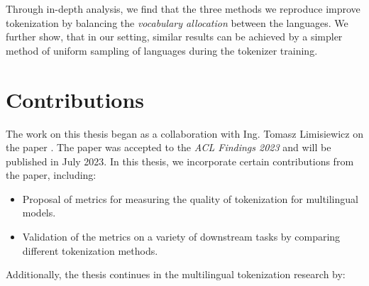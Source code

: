 
Through in-depth analysis, we find that the three methods we reproduce \cite{chung_improving_2020,zheng_allocating_2021,liang_xlm-v_2023} improve tokenization by balancing the \textit{vocabulary allocation} between the languages. We further show, that in our setting, similar results can be achieved by a simpler method of uniform sampling of languages during the tokenizer training. 

\section{Contributions}

The work on this thesis began as a collaboration with Ing. Tomasz Limisiewicz on the paper . The paper was accepted to the \textit{ACL Findings 2023} and will be published in July 2023. In this thesis, we incorporate certain contributions from the paper, including:

\begin{itemize}
    \item Proposal of metrics for measuring the quality of tokenization for multilingual models.
    \item Validation of the metrics on a variety of downstream tasks by comparing different tokenization methods.
\end{itemize}

Additionally, the thesis continues in the multilingual tokenization research by:

